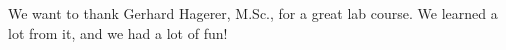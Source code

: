 We want to thank Gerhard Hagerer, M.Sc., for a great lab course. We learned a lot from it, and we had a lot of fun!